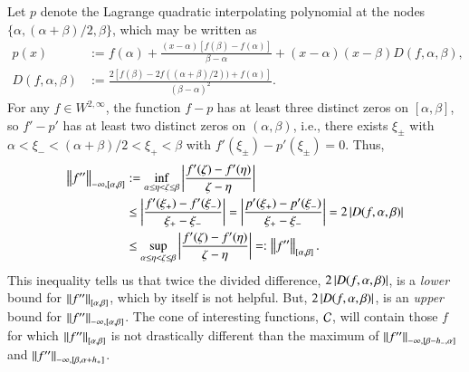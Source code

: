 \documentclass[review]{elsarticle}
\theoremstyle{definition}
\renewcommand{\cw}{W}
\begin{document}
Let $p$ denote the Lagrange quadratic interpolating polynomial at the nodes
$\{\alpha, (\alpha + \beta)/2, \beta\}$, which may be written as
\begin{align}
\nonumber
   p(x) & := f(\alpha) + \frac{(x-\alpha)[f(\beta) - f(\alpha)]}{\beta - \alpha}  + 
   (x-\alpha)(x-\beta) D(f,\alpha,\beta), 
\\ D(f,\alpha,\beta) &:= \frac{2[f(\beta) - 2f((\alpha + \beta)/2)) 
	+ f(\alpha)]}{(\beta - \alpha)^2}. \label{divdiffdef}
\end{align}
For any $f \in \cw^{2,\infty}$, the function $f - p$ has at least three distinct
zeros on $[\alpha,\beta]$, so $f' - p'$ has at least two distinct zeros on
$(\alpha,\beta)$, i.e., there exists $\xi_\pm$ with $\alpha < \xi_- < (\alpha +
\beta)/2 < \xi_+ < \beta$ with $f'(\xi_\pm) - p'(\xi_{\pm}) = 0$. Thus,
\begin{align} \label{NDDbdm}
     \norm[-\infty,{[\alpha,\beta]}]{f''} 
   & := \inf_{\alpha \le \eta < \zeta \le \beta} \abs{\frac{f'(\zeta) - f'(\eta)}{\zeta - \eta}} 
   \nonumber
\\ & \le \abs{\frac{f'(\xi_+) - f'(\xi_-)}{\xi_+ - \xi_-}} 
   = \abs{\frac{p'(\xi_+) - p'(\xi_-)}{\xi_+ - \xi_-}} = 2 \abs{D(f,\alpha,\beta)}  \nonumber
\\ & \le \sup_{\alpha \le \eta < \zeta \le \beta} \abs{\frac{f'(\zeta) - f'(\eta)}{\zeta - \eta}} 
=: \norm[{[\alpha,\beta]}]{f''}.
\end{align}
This inequality tells us that twice the divided difference,
$2\abs{D(f,\alpha,\beta)}$, is a \emph{lower} bound for
$\norm[{[\alpha,\beta]}]{f''}$, which by itself is not helpful. But,
$2\abs{D(f,\alpha,\beta)}$, is an \emph{upper} bound for
$\norm[-\infty,{[\alpha,\beta]}]{f''}$. The cone of interesting functions,
$\cc$, will contain those $f$ for which $\norm[{[\alpha,\beta]}]{f''}$ is not
drastically different than the maximum of $\norm[-\infty,{[\beta - h_-,
\alpha]}]{f''}$ and $\norm[-\infty,{[\beta, \alpha+ h_+]}]{f''}$.
\end{document}
